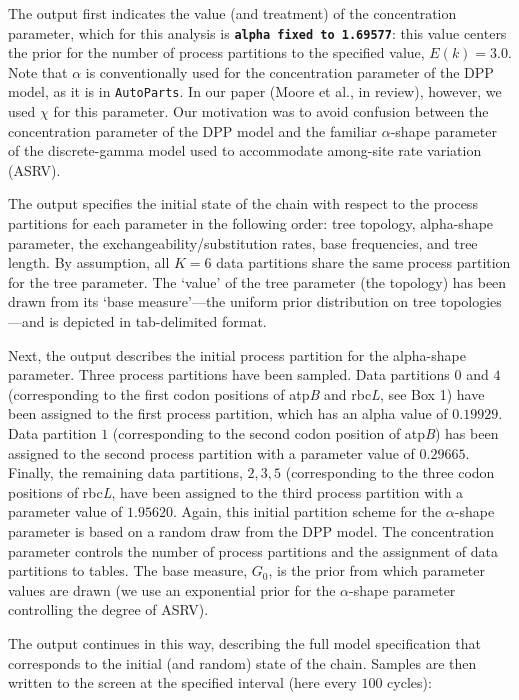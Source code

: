 \documentclass[11pt]{article}
\newcommand{\cl}[1]{{\texttt{\textbf{#1}}}}
\begin{document}
The output first indicates the value (and treatment) of the concentration parameter, which for this analysis is \cl{alpha fixed to 1.69577}: this value centers the prior for the number of process partitions to the specified value, $E(k)=3.0$.
Note that $\alpha$ is conventionally used for the concentration parameter of the DPP model, as it is in \verb!AutoParts!. 
In our paper (Moore et al., in review), however, we used $\chi$ for this parameter.  
Our motivation was to avoid confusion between the concentration parameter of the DPP model and the familiar $\alpha$-shape parameter of the discrete-gamma model used to accommodate among-site rate variation (ASRV).

The output specifies the initial state of the chain with respect to the process partitions for each parameter in the following order: tree topology, alpha-shape parameter, the exchangeability/substitution rates, base frequencies, and tree length.
By assumption, all $K=6$ data partitions share the same process partition for the tree parameter.
The `value' of the tree parameter (the topology) has been drawn from its `base measure'---the uniform prior distribution on tree topologies---and is depicted in tab-delimited format.

Next, the output describes the initial process partition for the alpha-shape parameter.
Three process partitions have been sampled.
Data partitions $0$ and $4$ (corresponding to the first codon positions of atp\emph{B} and rbc\emph{L}, see Box 1) have been assigned to the first process partition, which has an alpha value of $0.19929$.
Data partition $1$ (corresponding to the second codon position of atp\emph{B}) has been assigned to the second process partition with a parameter value of $0.29665$.
Finally, the remaining data partitions, $2, 3, 5$ (corresponding to the three codon positions of rbc\emph{L}, have been assigned to the third process partition with a parameter value of $1.95620$.
Again, this initial partition scheme for the $\alpha$-shape parameter is based on a random draw from the DPP model.
The concentration parameter controls the number of process partitions and the assignment of data partitions to tables.
The base measure, $G_0$, is the prior from which parameter values are drawn (we use an exponential prior for the $\alpha$-shape parameter controlling the degree of ASRV).

The output continues in this way, describing the full model specification that corresponds to the initial (and random) state of the chain. 
Samples are then written to the screen at the specified interval (here every $100$ cycles):
\end{document}

